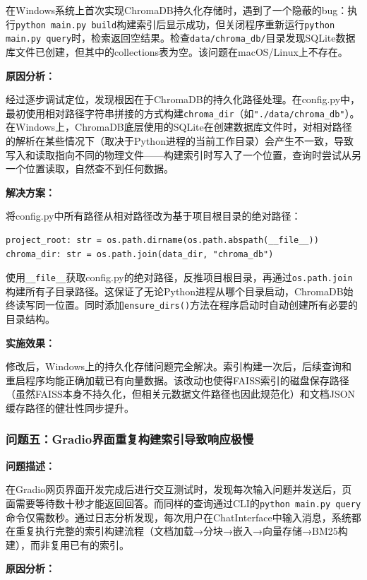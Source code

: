 \documentclass[10pt,a4paper]{article}
\begin{document}
在Windows系统上首次实现ChromaDB持久化存储时，遇到了一个隐蔽的bug：执行\texttt{python main.py build}构建索引后显示成功，但关闭程序重新运行\texttt{python main.py query}时，检索返回空结果。检查\texttt{data/chroma\_db/}目录发现SQLite数据库文件已创建，但其中的collections表为空。该问题在macOS/Linux上不存在。

\textbf{原因分析：}

经过逐步调试定位，发现根因在于ChromaDB的持久化路径处理。在config.py中，最初使用相对路径字符串拼接的方式构建\texttt{chroma\_dir}（如\texttt{"./data/chroma\_db"}）。在Windows上，ChromaDB底层使用的SQLite在创建数据库文件时，对相对路径的解析在某些情况下（取决于Python进程的当前工作目录）会产生不一致，导致写入和读取指向不同的物理文件——构建索引时写入了一个位置，查询时尝试从另一个位置读取，自然查不到任何数据。

\textbf{解决方案：}

将config.py中所有路径从相对路径改为基于项目根目录的绝对路径：

\begin{verbatim}
project_root: str = os.path.dirname(os.path.abspath(__file__))
chroma_dir: str = os.path.join(data_dir, "chroma_db")
\end{verbatim}

使用\texttt{\_\_file\_\_}获取config.py的绝对路径，反推项目根目录，再通过\texttt{os.path.join}构建所有子目录路径。这保证了无论Python进程从哪个目录启动，ChromaDB始终读写同一位置。同时添加\texttt{ensure\_dirs()}方法在程序启动时自动创建所有必要的目录结构。

\textbf{实施效果：}

修改后，Windows上的持久化存储问题完全解决。索引构建一次后，后续查询和重启程序均能正确加载已有向量数据。该改动也使得FAISS索引的磁盘保存路径（虽然FAISS本身不持久化，但相关元数据文件路径也因此规范化）和文档JSON缓存路径的健壮性同步提升。

\subsubsection{问题五：Gradio界面重复构建索引导致响应极慢}

\textbf{问题描述：}

在Gradio网页界面开发完成后进行交互测试时，发现每次输入问题并发送后，页面需要等待数十秒才能返回回答。而同样的查询通过CLI的\texttt{python main.py query}命令仅需数秒。通过日志分析发现，每次用户在ChatInterface中输入消息，系统都在重复执行完整的索引构建流程（文档加载→分块→嵌入→向量存储→BM25构建），而非复用已有的索引。

\textbf{原因分析：}
\end{document}

